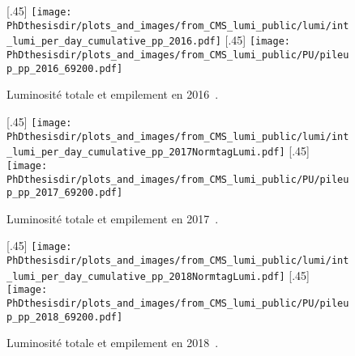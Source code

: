 \begin{figure}[p]
\centering

[.45\textwidth]
{\texttt{[image: \\PhDthesisdir/plots\_and\_images/from\_CMS\_lumi\_public/lumi/int\_lumi\_per\_day\_cumulative\_pp\_2016.pdf]}}
\hfill
{}[.45\textwidth]
{\texttt{[image: \\PhDthesisdir/plots\_and\_images/from\_CMS\_lumi\_public/PU/pileup\_pp\_2016\_69200.pdf]}}
\caption[Luminosité totale et empilement en 2016.]{Luminosité totale et empilement en 2016~\cite{CMS_lumi_public,CMS-PAS-LUM-17-001}.}
\label{fig-CMS_int_lumi_and_PU2016}

\vspace{.75\baselineskip}

[.45\textwidth]
{\texttt{[image: \\PhDthesisdir/plots\_and\_images/from\_CMS\_lumi\_public/lumi/int\_lumi\_per\_day\_cumulative\_pp\_2017NormtagLumi.pdf]}}
\hfill
{}[.45\textwidth]
{\texttt{[image: \\PhDthesisdir/plots\_and\_images/from\_CMS\_lumi\_public/PU/pileup\_pp\_2017\_69200.pdf]}}
\caption[Luminosité totale et empilement en 2017.]{Luminosité totale et empilement en 2017~\cite{CMS_lumi_public,CMS-PAS-LUM-17-004}.}
\label{fig-CMS_int_lumi_and_PU2017}

\vspace{.75\baselineskip}

[.45\textwidth]
{\texttt{[image: \\PhDthesisdir/plots\_and\_images/from\_CMS\_lumi\_public/lumi/int\_lumi\_per\_day\_cumulative\_pp\_2018NormtagLumi.pdf]}}
\hfill
{}[.45\textwidth]
{\texttt{[image: \\PhDthesisdir/plots\_and\_images/from\_CMS\_lumi\_public/PU/pileup\_pp\_2018\_69200.pdf]}}
\caption[Luminosité totale et empilement en 2018.]{Luminosité totale et empilement en 2018~\cite{CMS_lumi_public,CMS-PAS-LUM-18-002}.}
\label{fig-CMS_int_lumi_and_PU2018}
\end{figure}
